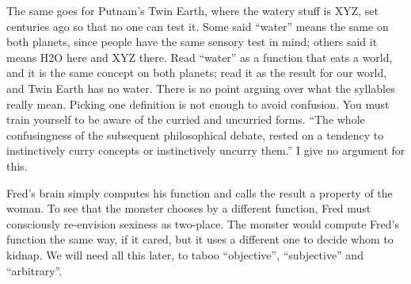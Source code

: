 The same goes for Putnam's Twin Earth, where the watery stuff is XYZ, set centuries ago so that no one can test it. Some said ``water'' means the same on both planets, since people have the same sensory test in mind; others said it means H2O here and XYZ there. Read ``water'' as a function that eats a world, and it is the same concept on both planets; read it as the result for our world, and Twin Earth has no water. There is no point arguing over what the syllables really mean. Picking one definition is not enough to avoid confusion. You must train yourself to be aware of the curried and uncurried forms. ``The whole confusingness of the subsequent philosophical debate, rested on a tendency to instinctively curry concepts or instinctively uncurry them.'' I give no argument for this. 

Fred's brain simply computes his function and calls the result a property of the woman. To see that the monster chooses by a different function, Fred must consciously re-envision sexiness as two-place. The monster would compute Fred's function the same way, if it cared, but it uses a different one to decide whom to kidnap. We will need all this later, to taboo ``objective'', ``subjective'' and ``arbitrary''.
